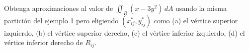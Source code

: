 \item Obtenga aproximaciones al valor de $\iint_R (x - 3y^2) \, dA$ usando la misma partición del ejemplo 1 pero eligiendo $(x_{ij}^*, y_{ij}^*)$ como (a) el vértice superior izquierdo, (b) el vértice superior derecho, (c) el vértice inferior izquierdo, (d) el vértice inferior derecho de $R_{ij}$.
